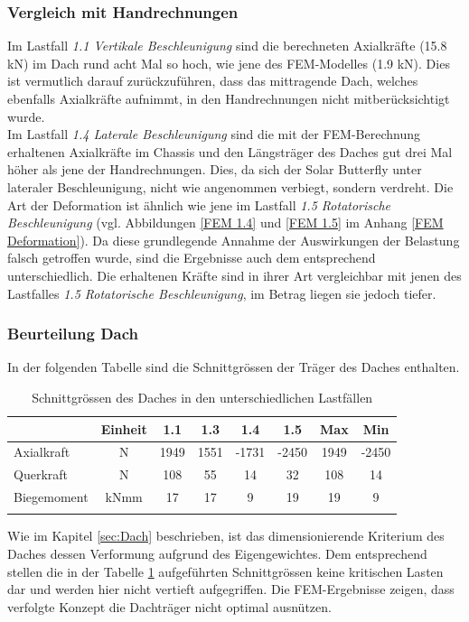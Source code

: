\subsubsection{Vergleich mit Handrechnungen}
Im Lastfall \emph{1.1 Vertikale Beschleunigung} sind die berechneten Axialkräfte (15.8 kN) im Dach rund acht Mal so hoch, wie jene des FEM-Modelles (1.9 kN). Dies ist vermutlich darauf zurückzuführen, dass das mittragende Dach, welches ebenfalls Axialkräfte aufnimmt, in den Handrechnungen nicht mitberücksichtigt wurde.\\
Im Lastfall \emph{1.4 Laterale Beschleunigung} sind die mit der FEM-Berechnung erhaltenen Axialkräfte im Chassis und den Längsträger des Daches gut drei Mal höher als jene der Handrechnungen. Dies, da sich der Solar Butterfly unter lateraler Beschleunigung, nicht wie angenommen verbiegt, sondern verdreht. Die Art der Deformation ist ähnlich wie jene im Lastfall \emph{1.5 Rotatorische Beschleunigung} (vgl. Abbildungen \ref{FEM 1.4} und \ref{FEM 1.5} im Anhang \ref{FEM Deformation}). Da diese grundlegende Annahme der Auswirkungen der Belastung falsch getroffen wurde, sind die Ergebnisse auch dem entsprechend unterschiedlich. Die erhaltenen Kräfte sind in ihrer Art vergleichbar mit jenen des Lastfalles \emph{1.5 Rotatorische Beschleunigung}, im Betrag liegen sie jedoch tiefer.\\

\subsubsection{Beurteilung Dach}
In der folgenden Tabelle sind die Schnittgrössen der Träger des Daches enthalten.

\begin{table}[H]
\centering
\begin{tabular}{lccccccc}
\thickhline
  &	Einheit	&	1.1	&	1.3	&	1.4	&	1.5	&	Max	&	Min	\\	\hline
Axialkraft	&	N	&	1949	&	1551	&	-1731	&	-2450	&	1949	&	-2450	\\
Querkraft	&	N	&	108	&	55	&	14	&	32	&	108	&	14	\\
Biegemoment	&	kNmm	&	17	&	17	&	9	&	19	&	19	&	9	\\	\thickhline
\end{tabular}
\caption{Schnittgrössen des Daches in den unterschiedlichen Lastfällen}
\label{tab:FEMres Dach}
\end{table}


Wie im Kapitel \ref{sec:Dach} beschrieben, ist das dimensionierende Kriterium des Daches dessen Verformung aufgrund des Eigengewichtes. Dem entsprechend stellen die in der Tabelle \ref{tab:FEMres Dach} aufgeführten Schnittgrössen keine kritischen Lasten dar und werden hier nicht vertieft aufgegriffen. Die FEM-Ergebnisse zeigen, dass verfolgte Konzept die Dachträger nicht optimal ausnützen.


